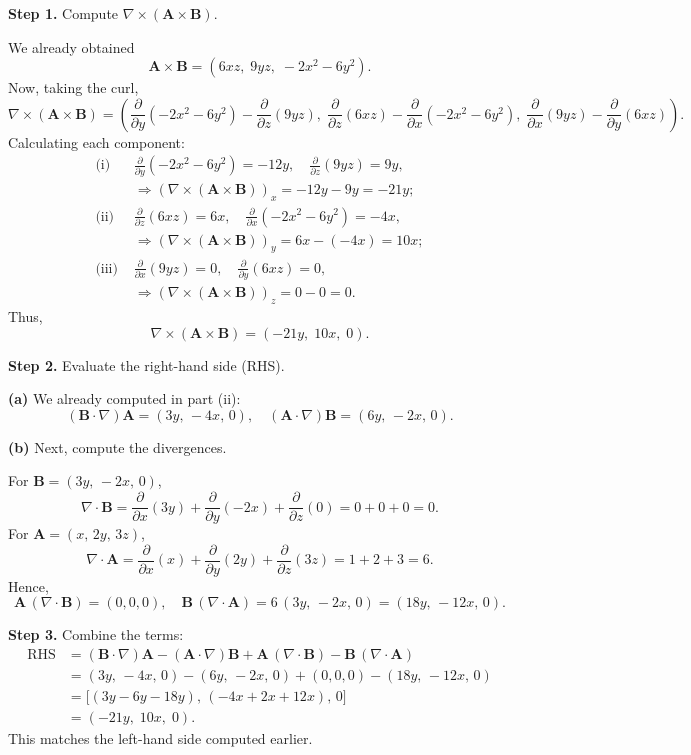 \begin{hwkProblem}{1.25}{}
	\textbf{Step 1.} Compute \(\nabla\times(\mathbf{A}\times\mathbf{B})\).

	We already obtained
	\[
		\mathbf{A}\times\mathbf{B} = (6xz,\;9yz,\;-2x^2-6y^2).
	\]
	Now, taking the curl,
	\[
		\nabla\times(\mathbf{A}\times\mathbf{B}) = \left( \frac{\partial}{\partial y}(-2x^2-6y^2) - \frac{\partial}{\partial z}(9yz),\; \frac{\partial}{\partial z}(6xz) - \frac{\partial}{\partial x}(-2x^2-6y^2),\; \frac{\partial}{\partial x}(9yz) - \frac{\partial}{\partial y}(6xz) \right).
	\]
	Calculating each component:
	\[
		\begin{aligned}
			\text{(i) }& \frac{\partial}{\partial y}(-2x^2-6y^2) = -12y, \quad \frac{\partial}{\partial z}(9yz)=9y,\\[1mm]
				   &\Rightarrow (\nabla\times(\mathbf{A}\times\mathbf{B}))_x = -12y - 9y = -21y;\\[1mm]
			\text{(ii) }& \frac{\partial}{\partial z}(6xz)=6x, \quad \frac{\partial}{\partial x}(-2x^2-6y^2)= -4x,\\[1mm]
				    &\Rightarrow (\nabla\times(\mathbf{A}\times\mathbf{B}))_y = 6x - (-4x) = 10x;\\[1mm]
			\text{(iii) }& \frac{\partial}{\partial x}(9yz)=0, \quad \frac{\partial}{\partial y}(6xz)=0,\\[1mm]
				     &\Rightarrow (\nabla\times(\mathbf{A}\times\mathbf{B}))_z = 0 - 0 = 0.
		\end{aligned}
	\]
	Thus,
	\[
		\nabla\times(\mathbf{A}\times\mathbf{B}) = (-21y,\;10x,\;0).
	\]

	\textbf{Step 2.} Evaluate the right-hand side (RHS).

	\textbf{(a)} We already computed in part (ii):
	\[
		(\mathbf{B}\cdot\nabla)\mathbf{A} = (3y,\,-4x,\,0),\quad (\mathbf{A}\cdot\nabla)\mathbf{B} = (6y,\,-2x,\,0).
	\]

	\textbf{(b)} Next, compute the divergences.

	For \(\mathbf{B} = (3y,\,-2x,\,0)\),
	\[
		\nabla\cdot\mathbf{B} = \frac{\partial}{\partial x}(3y) + \frac{\partial}{\partial y}(-2x) + \frac{\partial}{\partial z}(0)= 0 + 0 + 0 = 0.
	\]
	For \(\mathbf{A} = (x,\,2y,\,3z)\),
	\[
		\nabla\cdot\mathbf{A} = \frac{\partial}{\partial x}(x) + \frac{\partial}{\partial y}(2y) + \frac{\partial}{\partial z}(3z)= 1 + 2 + 3 = 6.
	\]
	Hence,
	\[
		\mathbf{A}\,(\nabla\cdot\mathbf{B}) = (0,0,0),\quad \mathbf{B}\,(\nabla\cdot\mathbf{A}) = 6\,(3y,\,-2x,\,0) = (18y,\,-12x,\,0).
	\]

	\textbf{Step 3.} Combine the terms:
	\[
		\begin{aligned}
			\text{RHS} &= (\mathbf{B}\cdot\nabla)\mathbf{A} - (\mathbf{A}\cdot\nabla)\mathbf{B} + \mathbf{A}\,(\nabla\cdot\mathbf{B}) - \mathbf{B}\,(\nabla\cdot\mathbf{A})\\[1mm]
				   &= (3y,\,-4x,\,0) - (6y,\,-2x,\,0) + (0,0,0) - (18y,\,-12x,\,0)\\[1mm]
				   &= \bigl[(3y-6y-18y),\,(-4x+2x+12x),\,0\bigr] \\[1mm]
				   &= (-21y,\;10x,\;0).
		\end{aligned}
	\]
	This matches the left-hand side computed earlier.


\end{hwkProblem}

